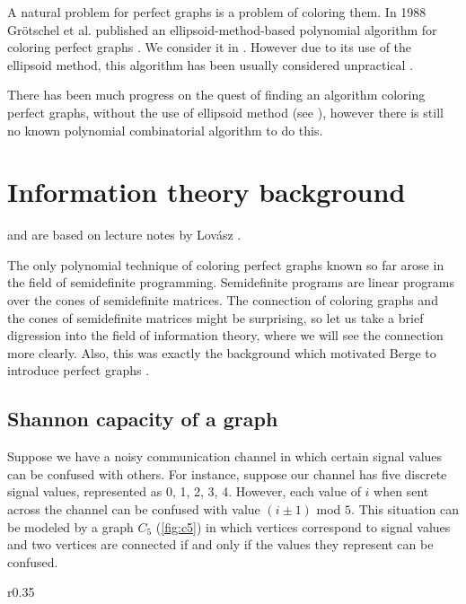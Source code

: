 A natural problem for perfect graphs is a problem of coloring them. In 1988 Gr\"otschel et al. published an ellipsoid-method-based polynomial algorithm for coloring perfect graphs \cite{Grtschel1993}. We consider it in . However due to its use of the ellipsoid method, this algorithm has been usually considered unpractical \cite{coloringSquareFree,Chudnovsky2003, coloringArtemis}.

There has been much progress on the quest of finding an algorithm coloring perfect graphs, without the use of ellipsoid method (see ), however there is still no known polynomial combinatorial algorithm to do this.

\section{Information theory background}
\label{sec:InformationTheory}

 and  are based on lecture notes by Lovász \cite{Lovasz95}.

The only polynomial technique of coloring perfect graphs known so far arose in the field of semidefinite programming. Semidefinite programs are linear programs over the cones of semidefinite matrices. The connection of coloring graphs and the cones of semidefinite matrices might be surprising, so let us take a brief digression into the field of information theory, where we will see the connection more clearly. Also, this was exactly the background which motivated Berge to introduce perfect graphs \cite{Chudnovsky2003}.

\subsection{Shannon capacity of a graph}
\label{sec:ShannonCapacity}

Suppose we have a noisy communication channel in which certain signal values can be confused with others. For instance, suppose our channel has five discrete signal values, represented as 0, 1, 2, 3, 4. However, each value of $i$ when sent across the channel can be confused with value $(i \pm 1)$ mod $5$. This situation can be modeled by a graph $C_5$ (\cref{fig:c5}) in which vertices correspond to signal values and two vertices are connected if and only if the values they represent can be confused.

\begin{wrapfigure}{r}{0.35\textwidth}
  
  \caption{An example of a noisy channel}%
  \label{fig:c5}
\end{wrapfigure}

